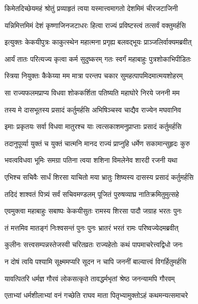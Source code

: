 \twolineshloka
{किमेतदिच्छेयमहं श्रोतुं प्रव्याहृतं त्वया}
{यस्मात्त्वमागतो देशमिमं चीरजटाजिनी} %

\twolineshloka
{यन्निमित्तमिमं देशं कृष्णाजिनजटाधरः}
{हित्वा राज्यं प्रविष्टस्त्वं तत्सर्वं वक्तुमर्हसि} %

\twolineshloka
{इत्युक्तः केकयीपुत्रः काकुत्स्थेन महात्मना}
{प्रगृह्य बलवद्भूयः प्राञ्जलिर्वाक्यमब्रवीत्} %

\twolineshloka
{आर्यं तातः परित्यज्य कृत्वा कर्म सुदुष्करम्}
{गतः स्वर्गं महाबाहुः पुत्रशोकाभिपीडितः} %

\twolineshloka
{स्त्रिया नियुक्तः कैकेय्या मम मात्रा परन्तप}
{चकार सुमहत्पापमिदमात्मयशोहरम्} %

\twolineshloka
{सा राज्यफलमप्राप्य विधवा शोककर्शिता}
{पतिष्यति महाघोरे निरये जननी मम} %

\twolineshloka
{तस्य मे दासभूतस्य प्रसादं कर्तुमर्हसि}
{अभिषिञ्चस्व चाद्यैव राज्येन मघवानिव} %

\twolineshloka
{इमाः प्रकृतयः सर्वा विधवा मातुरश्च याः}
{त्वत्सकाशमनुप्राप्ताः प्रसादं कर्तुमर्हसि} %

\twolineshloka
{तदानुपूर्व्या युक्तं च युक्तं चात्मनि मानद}
{राज्यं प्राप्नुहि धर्मेण सकामान्सुहृदः कुरु} %

\twolineshloka
{भवत्वविधवा भूमिः समग्रा पतिना त्वया}
{शशिना विमलेनेव शारदी रजनी यथा} %

\twolineshloka
{एभिश्च सचिवैः सार्धं शिरसा याचितो मया}
{भ्रातुः शिष्यस्य दासस्य प्रसादं कर्तुमर्हसि} %

\twolineshloka
{तदिदं शाश्वतं पित्र्यं सर्वं सचिवमण्डलम्}
{पूजितं पुरुषव्याघ्र नातिक्रमितुमुत्सहे} %

\twolineshloka
{एवमुक्त्वा महाबाहुः सबाष्पः केकयीसुतः}
{रामस्य शिरसा पादौ जग्राह भरतः पुनः} %

\twolineshloka
{तं मत्तमिव मातङ्गं निःश्वसन्तं पुनः पुनः}
{भ्रातरं भरतं रामः परिष्वज्येदमब्रवीत्} %

\twolineshloka
{कुलीनः सत्त्वसम्पन्नस्तेजस्वी चरितव्रतः}
{राज्यहेतोः कथं पापमाचरेत्त्वद्विधो जनः} %

\twolineshloka
{न दोषं त्वयि पश्यामि सूक्ष्ममप्यरि सूदन}
{न चापि जननीं बाल्यात्त्वं विगर्हितुमर्हसि} %

\twolineshloka
{यावत्पितरि धर्मज्ञ गौरवं लोकसत्कृते}
{तावद्धर्मभृतां श्रेष्ठ जनन्यामपि गौरवम्} %

\twolineshloka
{एताभ्यां धर्मशीलाभ्यां वनं गच्छेति राघव}
{माता पितृभ्यामुक्तोऽहं कथमन्यत्समाचरे} %

